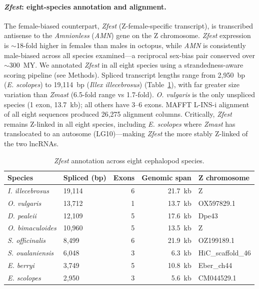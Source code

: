 \documentclass[12pt]{article}
\newcommand{\illex}{\textit{Illex illecebrosus}\xspace}
\begin{document}
\paragraph{\textit{Zfest}: eight-species annotation and alignment.}
The female-biased counterpart, \textit{Zfest} (Z-female-specific transcript),
is transcribed antisense to the \textit{Amnionless} (\textit{AMN}) gene
on the Z chromosome.
\textit{Zfest} expression is $\sim$18-fold higher in females than males in octopus,
while \textit{AMN} is consistently male-biased across all species examined---a
reciprocal sex-bias pair conserved over $\sim$300~MY.
We annotated \textit{Zfest} in all eight species
using a strandedness-aware scoring pipeline (see Methods).
Spliced transcript lengths range from 2,950~bp (\textit{E. scolopes})
to 19,114~bp (\illex)
(Table~\ref{tab:zfest_annotation}),
with far greater size variation than \textit{Zmast}
(6.5-fold range vs 1.7-fold).
\textit{O. vulgaris} is the only unspliced species (1 exon, 13.7~kb);
all others have 3--6 exons.
MAFFT L-INS-i alignment of all eight sequences
produced 26,275 alignment columns.
Critically, \textit{Zfest} remains Z-linked in all eight species,
including \textit{E. scolopes} where \textit{Zmast}
has translocated to an autosome (LG10)---making
\textit{Zfest} the more stably Z-linked of the two lncRNAs.

\begin{table}[tbp]
\centering
\small
\caption{\textit{Zfest} annotation across eight cephalopod species.}
\label{tab:zfest_annotation}
\begin{tabular}{llrrl}
\hline
Species & Spliced (bp) & Exons & Genomic span & Z chromosome \\
\hline
\textit{I. illecebrosus} & 19,114 & 6 & 21.7~kb & Z \\
\textit{O. vulgaris} & 13,712 & 1 & 13.7~kb & OX597829.1 \\
\textit{D. pealeii} & 12,109 & 5 & 17.6~kb & Dpe43 \\
\textit{O. bimaculoides} & 10,960 & 5 & 13.5~kb & Z \\
\textit{S. officinalis} & 8,499 & 6 & 21.9~kb & OZ199189.1 \\
\textit{S. oualaniensis} & 6,048 & 3 & 6.3~kb & HiC\_scaffold\_46 \\
\textit{E. berryi} & 3,749 & 5 & 10.8~kb & Eber\_ch44 \\
\textit{E. scolopes} & 2,950 & 3 & 5.6~kb & CM044529.1 \\
\hline
\end{tabular}
\end{table}
\end{document}
